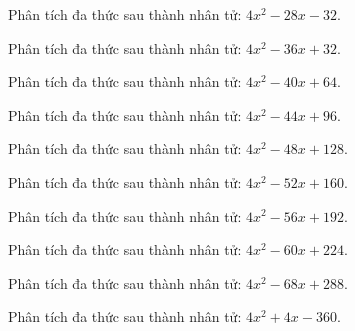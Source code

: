 \begin{bt}
	Phân tích đa thức sau thành nhân tử: $4 x^2 - 28 x - 32$.
\end{bt}
\begin{bt}
	Phân tích đa thức sau thành nhân tử: $4 x^2 - 36 x + 32$.
\end{bt}
\begin{bt}
	Phân tích đa thức sau thành nhân tử: $4 x^2 - 40 x + 64$.
\end{bt}
\begin{bt}
	Phân tích đa thức sau thành nhân tử: $4 x^2 - 44 x + 96$.
\end{bt}
\begin{bt}
	Phân tích đa thức sau thành nhân tử: $4 x^2 - 48 x + 128$.
\end{bt}
\begin{bt}
	Phân tích đa thức sau thành nhân tử: $4 x^2 - 52 x + 160$.
\end{bt}
\begin{bt}
	Phân tích đa thức sau thành nhân tử: $4 x^2 - 56 x + 192$.
\end{bt}
\begin{bt}
	Phân tích đa thức sau thành nhân tử: $4 x^2 - 60 x + 224$.
\end{bt}
\begin{bt}
	Phân tích đa thức sau thành nhân tử: $4 x^2 - 68 x + 288$.
\end{bt}
\begin{bt}
	Phân tích đa thức sau thành nhân tử: $4 x^2 + 4 x - 360$.
\end{bt}
